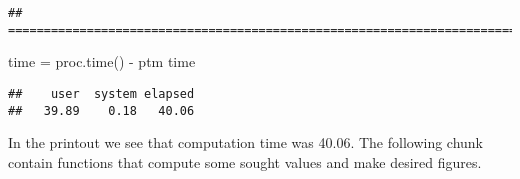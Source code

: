 \documentclass[
]{article}
\newenvironment{Shaded}{\begin{snugshade}}{\end{snugshade}}
\newcommand{\FunctionTok}[1]{\textcolor[rgb]{0.00,0.00,0.00}{#1}}
\newcommand{\NormalTok}[1]{#1}
\newcommand{\OtherTok}[1]{\textcolor[rgb]{0.56,0.35,0.01}{#1}}
\newcommand{\SpecialCharTok}[1]{\textcolor[rgb]{0.00,0.00,0.00}{#1}}
\begin{document}
\begin{verbatim}
## ================================================================================
\end{verbatim}

\begin{Shaded}
\begin{Highlighting}[]
\NormalTok{time }\OtherTok{=} \FunctionTok{proc.time}\NormalTok{() }\SpecialCharTok{{-}}\NormalTok{ ptm}
\NormalTok{time}
\end{Highlighting}
\end{Shaded}

\begin{verbatim}
##    user  system elapsed 
##   39.89    0.18   40.06
\end{verbatim}

In the printout we see that computation time was 40.06. The following chunk contain functions that compute some sought values and make desired figures.
\end{document}
